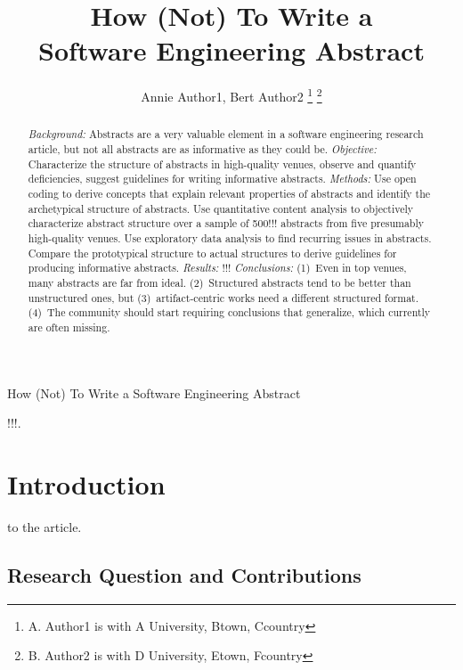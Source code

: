 \documentclass[10pt,journal,compsoc]{IEEEtran}
\begin{document}
	
\title{How (Not) To Write a\\Software Engineering Abstract}

\author{Annie Author1, Bert Author2
\thanks{A. Author1 is with A University, Btown, Ccountry}
\thanks{B. Author2 is with D University, Etown, Fcountry}}

%
{How (Not) To Write a Software Engineering Abstract}

\maketitle

\begin{abstract}  %
\emph{Background:}
Abstracts are a very valuable element in a software engineering research article,
but not all abstracts are as informative as they could be.
\emph{Objective:} 
Characterize the structure of abstracts in high-quality venues, 
observe and quantify deficiencies, 
suggest guidelines for writing informative abstracts.
\emph{Methods:}
Use open coding to derive concepts that explain relevant properties of abstracts
and identify the archetypical structure of abstracts.
Use quantitative content analysis to objectively characterize abstract structure
over a sample of 500!!! abstracts from five presumably high-quality venues.
Use exploratory data analysis to find recurring issues in abstracts.
Compare the prototypical structure to actual structures to derive
guidelines for producing informative abstracts.
\emph{Results:}
!!!
\emph{Conclusions:}
(1)~Even in top venues, many abstracts are far from ideal.
(2)~Structured abstracts tend to be better than unstructured ones, 
but (3)~artifact-centric works need a different structured format.
(4)~The community should start requiring conclusions that generalize, 
which currently are often missing.
\end{abstract}

\begin{IEEEkeywords}
!!!.
\end{IEEEkeywords}


\section{Introduction}
 to the article.

\subsection{Research Question and Contributions}
\end{document}
